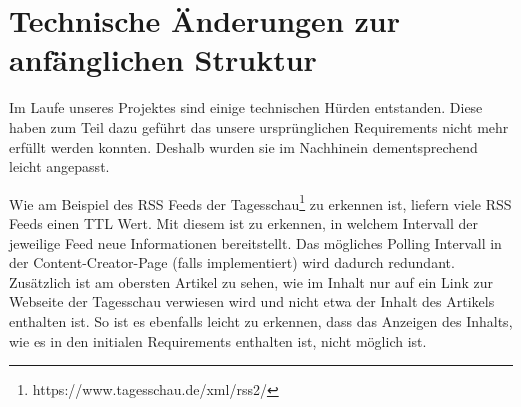 \section{Technische Änderungen zur anfänglichen Struktur} \label{tech_changes}
Im Laufe unseres Projektes sind einige technischen Hürden entstanden. Diese haben zum Teil dazu geführt das unsere ursprünglichen Requirements nicht mehr erfüllt werden konnten.
Deshalb wurden sie im Nachhinein dementsprechend leicht angepasst.

\begin{table}[h]
\caption{Tabelle – Änderungen zur anfänglichen Struktur}
\end{table}

Wie am Beispiel des RSS Feeds der Tagesschau\footnote{https://www.tagesschau.de/xml/rss2/} zu erkennen ist, liefern viele RSS Feeds einen TTL Wert.
Mit diesem ist zu erkennen, in welchem Intervall der jeweilige Feed neue Informationen bereitstellt. Das mögliches Polling Intervall in der Content-Creator-Page (falls implementiert) wird dadurch redundant.
Zusätzlich ist am obersten Artikel zu sehen, wie im Inhalt nur auf ein Link zur Webseite der Tagesschau verwiesen wird und nicht etwa der Inhalt des Artikels enthalten ist.
So ist es ebenfalls leicht zu erkennen, dass das Anzeigen des Inhalts, wie es in den initialen Requirements enthalten ist, nicht möglich ist.

